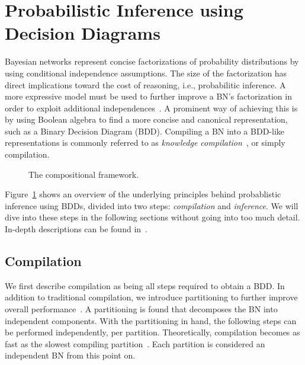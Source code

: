 
\section{Probabilistic Inference using Decision Diagrams}\label{sec:parallel}

Bayesian networks represent concise factorizations of probability distributions by using conditional independence assumptions. The size of the factorization has direct implications toward the cost of reasoning, i.e., probabilitic inference. A more expressive model must be used to further improve a BN's factorization in order to exploit additional independences~\cite{boutilier1996context,friedman1998learning,zhang1996exploiting}. A prominent way of achieving this is by using Boolean algebra to find a more concise and canonical representation, such as a Binary Decision Diagram (BDD). Compiling a BN into a BDD-like representations is commonly referred to as \emph{knowledge compilation}~\cite{darwiche2002knowledge}, or simply compilation.

\begin{figure}[!t]
    \centering
    \scalebox{0.9}{
        
    }
    \caption{The compositional framework.}
    \label{fig:frameworkoverview}
\end{figure}


Figure~\ref{fig:frameworkoverview} shows an overview of the underlying principles behind probablistic inference using BDDs, divided into two steps: \emph{compilation} and \emph{inference}. We will dive into these steps in the following sections without going into too much detail. In-depth descriptions can be found in~\cite{dal2017reducing,dal2021compositional}.

\subsection{Compilation}

We first describe compilation as being all steps required to obtain a BDD. In addition to traditional compilation, we introduce partitioning to further improve overall performance~\cite{dal2017reducing,dal2021compositional}. A partitioning is found that decomposes the BN into independent components. With the partitioning in hand, the following steps can be performed independently, per partition. Theoretically, compilation becomes as fast as the slowest compiling partition~\cite{dal2018parallel}. Each partition is considered an independent BN from this point on.

